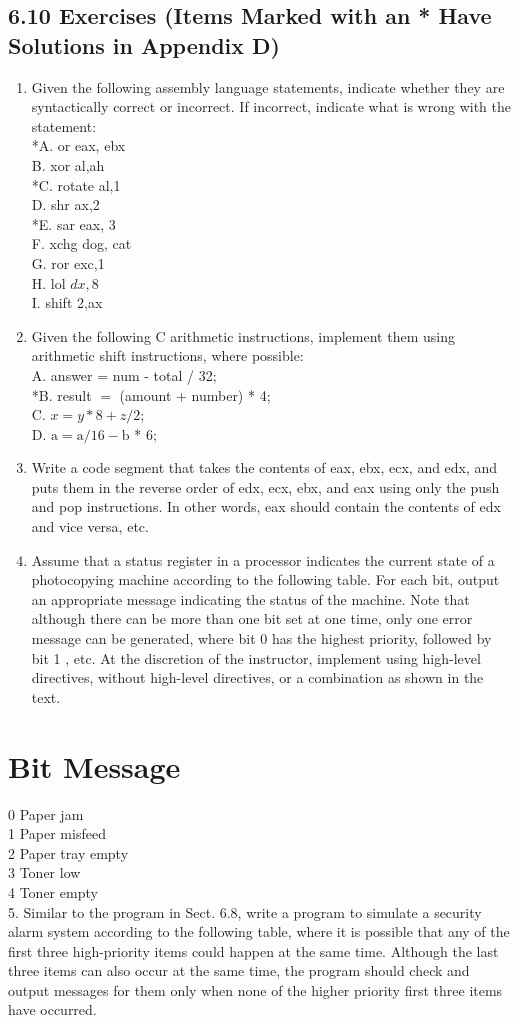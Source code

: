 \documentclass[10pt]{book}
\begin{document}
\subsection*{6.10 Exercises (Items Marked with an * Have Solutions in Appendix D)}
\begin{enumerate}
  \item Given the following assembly language statements, indicate whether they are syntactically correct or incorrect. If incorrect, indicate what is wrong with the statement:\\
*A. or eax, ebx\\
B. xor al,ah\\
*C. rotate al,1\\
D. shr ax,2\\
*E. sar eax, 3\\
F. xchg dog, cat\\
G. ror exc,1\\
H. lol $d x, 8$\\
I. shift 2,ax
  \item Given the following C arithmetic instructions, implement them using arithmetic shift instructions, where possible:\\
A. answer = num - total / 32;\\
*B. result $=$ (amount + number) * 4;\\
C. $x=y * 8+z / 2$;\\
D. $\mathrm{a}=\mathrm{a} / 16-\mathrm{b}$ * 6;
  \item Write a code segment that takes the contents of eax, ebx, ecx, and edx, and puts them in the reverse order of edx, ecx, ebx, and eax using only the push and pop instructions. In other words, eax should contain the contents of edx and vice versa, etc.
  \item Assume that a status register in a processor indicates the current state of a photocopying machine according to the following table. For each bit, output an appropriate message indicating the status of the machine. Note that although there can be more than one bit set at one time, only one error message can be generated, where bit 0 has the highest priority, followed by bit 1 , etc. At the discretion of the instructor, implement using high-level directives, without high-level directives, or a combination as shown in the text.
\end{enumerate}

\section*{Bit Message}
0 Paper jam\\
1 Paper misfeed\\
2 Paper tray empty\\
3 Toner low\\
4 Toner empty\\
5. Similar to the program in Sect. 6.8, write a program to simulate a security alarm system according to the following table, where it is possible that any of the first three high-priority items could happen at the same time. Although the last three items can also occur at the same time, the program should check and output messages for them only when none of the higher priority first three items have occurred.
\end{document}
